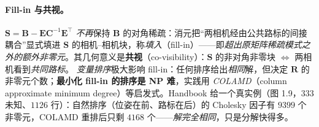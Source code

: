 \paragraph{Fill-in 与共视。}\cite{gaoxiang2019slam14,dellaert2017factor,carlone2026handbook}
$\mathbf{S}=\mathbf{B}-\mathbf{E}\mathbf{C}^{-1}\mathbf{E}^\top$ \emph{不再}保持 $\mathbf{B}$ 的对角稀疏：消元把“两相机经由公共路标的间接耦合”显式填进 $\mathbf{S}$ 的相机--相机块，称\emph{填入}（fill-in）——即\emph{超出原矩阵稀疏模式之外的额外非零元}\cite{carlone2026handbook}。其几何意义是\textbf{共视}（co-visibility）：$\mathbf{S}$ 的非对角非零块 $\iff$ 两相机看到\emph{共同路标}。
\emph{变量排序}极大影响 fill-in：任何排序给出\emph{相同}解，但决定 $\mathbf{R}$ 的非零元个数；\textbf{最小化 fill-in 的排序是 NP 难}\cite{dellaert2017factor,carlone2026handbook}，实践用 \emph{COLAMD}（column approximate minimum degree）等启发式。Handbook\cite{carlone2026handbook} 给一个真实例（图 1.9，$333$ 未知、$1126$ 行）：自然排序（位姿在前、路标在后）的 Cholesky 因子有 $9399$ 个非零元，COLAMD 重排后只剩 $4168$ 个——\emph{解完全相同}，只是分解快得多。

